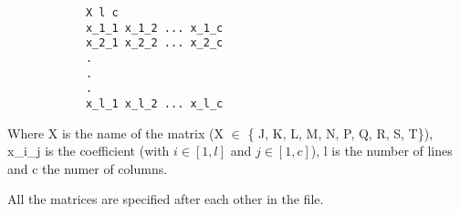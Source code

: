 		\begin{verbatim}
			X l c
			x_1_1 x_1_2 ... x_1_c
			x_2_1 x_2_2 ... x_2_c
			.
			.
			.
			x_l_1 x_l_2 ... x_l_c
		\end{verbatim}

		Where X is the name of the matrix (X $\in$ \{ J, K, L, M, N, P, Q, R, S, T\}), x\_i\_j is the coefficient (with $i \in [1, l]$ and $j \in [1, c]$), l is the number of lines and c the numer of columns.

		All the matrices are specified after each other in the file.




